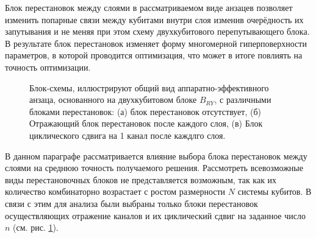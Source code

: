 \documentclass[14pt]{extarticle}
\begin{document}
\qquad Блок перестановок между слоями в рассматриваемом виде анзацев позволяет изменить попарные связи между кубитами внутри слоя изменив очерёдность их запутывания и не меняя при этом схему двухкубитового перепутывающего блока. В результате блок перестановок изменяет форму многомерной гиперповерхности параметров, в которой проводится оптимизация, что может в итоге повлиять на точность оптимизации.

\begin{figure}[H]
\begin{minipage}[H]{1.\linewidth}
\end{minipage}
\vfill
\begin{minipage}[H]{1.\linewidth}
\end{minipage}
\vfill
\begin{minipage}[H]{1.\linewidth}
\end{minipage}
\caption{Блок-схемы, иллюстрируют общий вид аппаратно-эффективного анзаца, основанного на двухкубитовом блоке $B_{RY}$, с различными блоками перестановок: (а) блок перестановок отсутствует, (б) Отражающий блок перестановок после каждого слоя, (в) Блок циклического сдвига на 1 канал после каждлго слоя.}\label{fig:permutation_block}
\end{figure}

\qquad В данном параграфе рассматривается влияние выбора блока перестановок между слоями на среднюю точность получаемого решения. Рассмотреть всевозможные виды перестановочных блоков не представляется возможным, так как их количество комбинаторно возрастает с ростом размерности $N$ системы кубитов. В связи с этим для анализа были выбраны только блоки перестановок осуществляющих отражение каналов и их циклический сдвиг на заданное число $n$ (см. рис. \ref{fig:permutation_block}).
\end{document}
